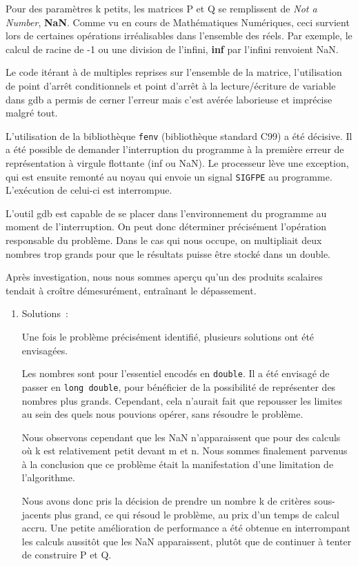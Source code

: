 \documentclass{article}
\begin{document}
\begin{enumerate}
\begin{enumerate}
Pour des paramètres k petits, les matrices P et Q se remplissent de \emph{Not a Number},
\textbf{NaN}. Comme vu en cours de Mathématiques Numériques, ceci survient lors de
certaines opérations irréalisables dans l’ensemble des réels. Par exemple, le
calcul de racine de -1 ou une division de l’infini, \textbf{inf} par l’infini renvoient
NaN.

Le code itérant à de multiples reprises sur l’ensemble de la matrice,
l’utilisation de point d’arrêt conditionnels et point d’arrêt à la
lecture/écriture de variable dans gdb a permis de cerner l’erreur mais c’est
avérée laborieuse et imprécise malgré tout.

L’utilisation de la bibliothèque \texttt{fenv} (bibliothèque standard C99) a été
décisive. Il a été possible de demander l’interruption du programme à la
première erreur de représentation à virgule flottante (inf ou NaN). Le
processeur lève une exception, qui est ensuite remonté au noyau qui envoie un
signal \texttt{SIGFPE} au programme. L’exécution de celui-ci est interrompue.

L’outil gdb est capable de se placer dans l’environnement du programme au moment
de l’interruption. On peut donc déterminer précisément l’opération responsable
du problème. Dans le cas qui nous occupe, on multipliait deux nombres trop
grands pour que le résultats puisse être stocké dans un double.

Après investigation, nous nous sommes aperçu qu’un des produits scalaires
tendait à croître démesurément, entraînant le dépassement.

\begin{enumerate}
\item Solutions :
\label{sec:org966338a}

Une fois le problème précisément identifié, plusieurs solutions ont été envisagées.

Les nombres sont pour l’essentiel encodés en \texttt{double}. Il a été envisagé de
passer en \texttt{long double}, pour bénéficier de la possibilité de représenter des
nombres plus grands. Cependant, cela n’aurait fait que repousser les limites au
sein des quels nous pouvions opérer, sans résoudre le problème.

Nous observons cependant que les NaN n’apparaissent que pour des calculs où k est
relativement petit devant m et n. Nous sommes finalement parvenus à la
conclusion que ce problème était la manifestation d’une limitation de
l’algorithme.

Nous avons donc pris la décision de prendre un nombre k de critères sous-jacents
plus grand, ce qui résoud le problème, au prix d’un temps de calcul accru. Une
petite amélioration de performance a été obtenue en interrompant les calculs
aussitôt que les NaN apparaissent, plutôt que de continuer à tenter de construire P et Q.
\end{enumerate}
\end{enumerate}
\end{enumerate}
\end{document}
